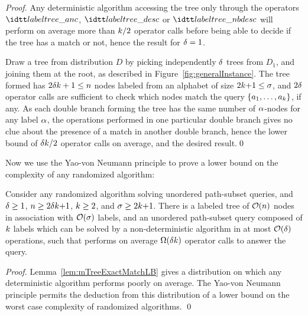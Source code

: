 \begin{proof}
%
Any deterministic algorithm accessing the tree only through the
operators $\LabTreeAnc$, $\LabTreeDesc$ or $\LabTreeNbDesc$ will
perform on average more than $k/2$ operator calls before
being able to decide if the tree has a match or not, hence the result
for $\delta=1$.

Draw a tree from distribution $D$ by picking independently
$\delta$ trees from $D_1$, and joining them at the root, as
described in Figure~\ref{fig:generalInstance}.
%
The tree formed has $2\delta k+1\leq n$ nodes
labeled from an alphabet of size $2k{+}1\leq\sigma$, and
$2\delta$ operator calls are sufficient to check which nodes
match the query $\{a_1,\ldots,a_{k}\}$, if any.
%
As each double branch forming the tree has the same number of
$\alpha$-nodes for any label $\alpha$, the operations performed in one
particular double branch gives no clue about the presence of a match
in another double branch, hence the lower bound of
$\delta k/2$ operator calls on average, and the desired
result.\qed
\end{proof}

Now we use the Yao-von Neumann principle
\cite{vonneumann1944,sion58,yao} to prove a lower bound on the
complexity of any randomized algorithm:

\begin{theorem}\label{th:mTreeExactMatchLB}
  Consider any randomized algorithm  solving unordered
  path-subset queries, and $\delta\geq1$,
  $n\geq2\delta k{+}1$, $k\geq2$, and
  $\sigma\geq2k{+}1$.
%
  There is a labeled tree of ${\cal O}(n)$ nodes in
  association with ${\cal O}(\sigma)$ labels, and an unordered
  path-subset query composed of $k$ labels which can be
  solved by a non-deterministic algorithm in at most ${\cal
    O}(\delta)$ operations, such that  performs on average
  $\Omega(\delta k)$ operator calls to answer the query.
\end{theorem}

\begin{proof} %
  Lemma~\ref{lem:mTreeExactMatchLB} gives a distribution on which any
  deterministic algorithm performs poorly on average.  The Yao-von
  Neumann principle permits the deduction from this distribution of a
  lower bound on the worst case complexity of randomized algorithms.
  \qed
\end{proof}

